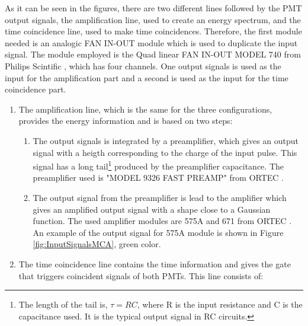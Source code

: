 As it can be seen in the figures, there are two different lines followed by the PMT output signals, the amplification line, used to create an energy spectrum, and the time coincidence line, used to make time coincidences. Therefore, the first module needed is an analogic FAN IN-OUT module which is used to duplicate the input signal. The module employed is the Quad linear FAN IN-OUT MODEL 740 from Philips Scintific \cite{DataSheetFANINOUT}, which has four channels. One output signals is used as the input for the amplification part and a second is used as the input for the time coincidence part.

\begin{enumerate}

\item{} The amplification line, which is the same for the three configurations, provides the energy information and is based on two steps:



\begin{enumerate}

\item{} The output signals is integrated by a preamplifier, which gives an output signal with a heigth corresponding to the charge of the input pulse. This signal has a long tail\footnote{The length of the tail is, $\tau=RC$, where R is the input resistance and C is the capacitance used. It is the typical output signal in RC circuits.} produced by the preamplifier capacitance. The preamplifier used is "MODEL 9326 FAST PREAMP" from ORTEC \cite{DataSheetPreAmp}.

\item{} The output signal from the preamplifier is lead to the amplifier which gives an amplified output signal with a shape close to a Gaussian function. The used  amplifier modules are 575A and 671 from ORTEC \cite{DataSheet575Amp, DataSheet671Amp}. An example of the output signal for 575A module is shown in Figure \ref{fig:InputSignalsMCA}, green color.

\end{enumerate}

\item{} The time coincidence line contains the time information and gives the gate that triggers coincident signals of both PMTs. This line consists of:


\end{enumerate}
